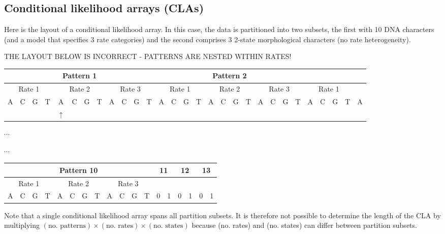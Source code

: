 \subsection{Conditional likelihood arrays (CLAs)}

Here is the layout of a conditional likelihood array. In this case, the data is partitioned into two subsets, the first with 10 DNA characters (and a model that specifies 3 rate categories) and the second comprises 3 2-state morphological characters (no rate heterogeneity).

THE LAYOUT BELOW IS INCORRECT - PATTERNS ARE NESTED WITHIN RATES!

\resizebox{5.5in}{!} {
\begin{tabular}{|c|c|c|c|c|c|c|c|c|c|c|c|c|c|c|c|c|c|c|c|c|c|c|c|c|c|c|c|c} \hline
\multicolumn{12}{|c|}{Pattern 1} & \multicolumn{12}{c|}{Pattern 2} & \multicolumn{5}{c}{} \\ \hline
\multicolumn{4}{|c|}{Rate 1} & \multicolumn{4}{c|}{Rate 2} &\multicolumn{4}{c|}{Rate 3} &
\multicolumn{4}{c|}{Rate 1} &\multicolumn{4}{c|}{Rate 2} &\multicolumn{4}{c|}{Rate 3} &\multicolumn{4}{c|}{Rate 1} & \\ \hline
A & C & G & T & A & C & G & T & A & C & G & T & A & C & G & T & A & C & G & T & A & C & G & T & A & C & G & T & A \\ \hline
\multicolumn{4}{c}{} & \multicolumn{1}{c}{$\uparrow$} &   \multicolumn{24}{c}{} 
\end{tabular}
}
$\cdots$

$\cdots$
\resizebox{3.5in}{!} {
\begin{tabular}{|c|c|c|c|c|c|c|c|c|c|c|c|c|c|c|c|c|c|} \hline
\multicolumn{12}{|c|}{Pattern 10} & \multicolumn{2}{|c|}{11} & \multicolumn{2}{|c|}{12} & \multicolumn{2}{|c|}{13} \\ \hline
\multicolumn{4}{|c|}{Rate 1} & \multicolumn{4}{c|}{Rate 2} & \multicolumn{4}{c|}{Rate 3} & \multicolumn{2}{c|}{} & \multicolumn{2}{c|}{} & \multicolumn{2}{c|}{} \\ \hline
A & C & G & T & A & C & G & T & A & C & G & T & 0 & 1 & 0 & 1 & 0 & 1 \\ \hline
\end{tabular}
}

Note that a single conditional likelihood array spans all partition subsets. It is therefore not possible to determine the length of the CLA by multiplying $(\mbox{no. patterns})\times(\mbox{no. rates})\times(\mbox{no. states})$ because (no. rates) and (no. states) can differ between partition subsets.

